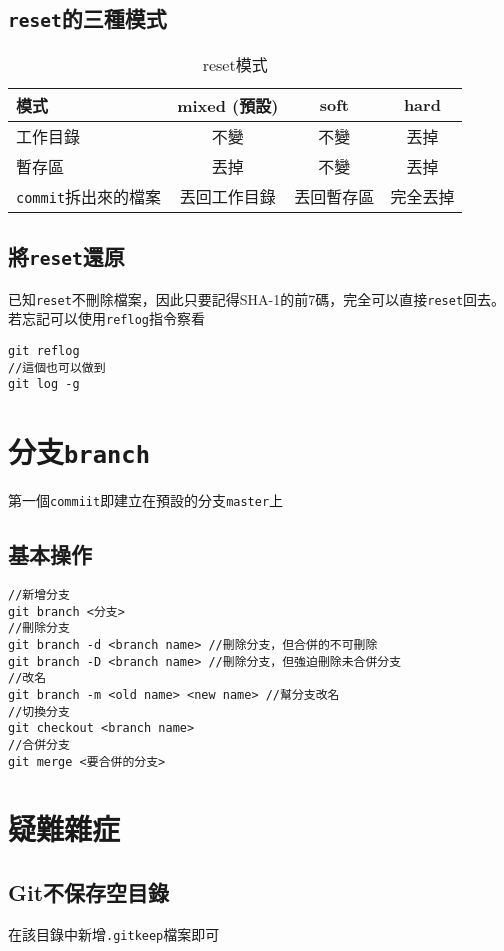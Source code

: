 \documentclass{article}
\newcommand{\code}[1]{\texttt{#1}}
\begin{document}
\subsection{\code{reset}的三種模式}
\begin{table}[h]
	\centering
	\begin{tabular}{|l|c|c|c|}
		\hline
		模式 & mixed (預設) & soft & hard \\
		\hline
		工作目錄 & 不變 & 不變 & 丟掉 \\
		\hline
		暫存區 & 丟掉 & 不變 & 丟掉 \\
		\hline
		\code{commit}拆出來的檔案 & 丟回工作目錄 & 丟回暫存區 & 完全丟掉 \\
		\hline
	\end{tabular}
	\caption{reset模式}
\end{table}

\subsection{將\code{reset}還原}
已知\code{reset}不刪除檔案，因此只要記得SHA-1的前7碼，完全可以直接\code{reset}回去。若忘記可以使用\code{reflog}指令察看
\begin{lstlisting}[language=git]
git reflog
//這個也可以做到
git log -g
\end{lstlisting}

\section{分支\code{branch}}
第一個\code{commiit}即建立在預設的分支\code{master}上
\subsection{基本操作}
\begin{lstlisting}[language=git]
//新增分支
git branch <分支>
//刪除分支 
git branch -d <branch name> //刪除分支，但合併的不可刪除
git branch -D <branch name> //刪除分支，但強迫刪除未合併分支
//改名
git branch -m <old name> <new name> //幫分支改名
//切換分支
git checkout <branch name>
//合併分支
git merge <要合併的分支> 
\end{lstlisting}

\section{疑難雜症}

\subsection{Git不保存空目錄}
在該目錄中新增\code{.gitkeep}檔案即可
\end{document}
